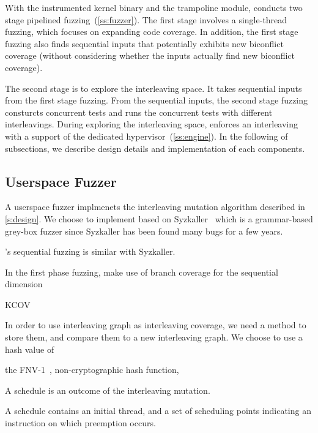 With the instrumented kernel binary and the trampoline module, \sys
conducts two stage pipelined fuzzing~(\autoref{ss:fuzzer}).
%
The first stage involves a single-thread fuzzing, which focuses on
expanding code coverage. In addition, the first stage fuzzing also
finds sequential inputs that potentially exhibits new biconflict
coverage (without considering whether the inputs actually find new
biconflict coverage).

The second stage is to explore the interleaving space. It takes
sequential inputs from the first stage fuzzing. From the sequential
inputs, the second stage fuzzing consturcts concurrent tests and runs
the concurrent tests with different interleavings.
%
During exploring the interleaving space, \sys enforces an interleaving
with a support of the dedicated hypervisor~(\autoref{ss:engine}).
%
In the following of subsections, we describe design details and
implementation of each components.




\subsection{Userspace Fuzzer}
\label{ss:fuzzer}

A userspace fuzzer implmenets the interleaving mutation algorithm
described in \autoref{s:design}.
%
We choose to implement \sys based on Syzkaller~\cite{syzkaller} which
is a grammar-based grey-box fuzzer since Syzkaller has been found many
bugs for a few years.
%

%
\sys's sequential fuzzing is similar with Syzkaller.

In the first phase fuzzing, \sys make use of branch coverage for the
sequential dimension


KCOV~\cite{kcov}


%
In order to use interleaving graph as interleaving coverage, we need a
method to store them, and compare them to a new interleaving graph.
%
We choose to use a hash value of

the FNV-1~\cite{fnv, fnv-go}, non-cryptographic hash function,


A schedule is an outcome of the interleaving mutation.

A schedule contains an initial thread, and a set of scheduling points
indicating an instruction on which preemption occurs.


